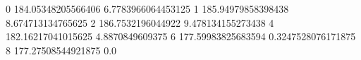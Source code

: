 0 184.05348205566406 6.7783966064453125
1 185.94979858398438 8.674713134765625
2 186.7532196044922 9.478134155273438
4 182.16217041015625 4.8870849609375
6 177.59983825683594 0.3247528076171875
8 177.27508544921875 0.0
